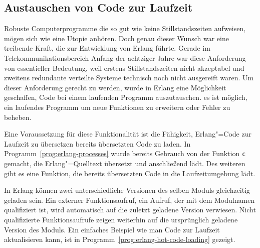 \subsection{Austauschen von Code zur Laufzeit}

Robuste Computerprogramme die so gut wie keine Stillstandszeiten aufweisen, mögen sich wie eine Utopie anhören. Doch genau dieser Wunsch war eine treibende Kraft, die zur Entwicklung von Erlang führte. Gerade im Telekommunikationsbereich Anfang der achtziger Jahre war diese Anforderung von essentieller Bedeutung, weil erstens Stillstandszeiten nicht akzeptabel und zweitens redundante verteilte Systeme technisch noch nicht ausgereift waren. Um dieser Anforderung gerecht zu werden, wurde in Erlang eine Möglichkeit geschaffen, Code bei einem laufenden Programm auszutauschen. \Dah es ist möglich, ein laufendes Programm um neue Funktionen zu erweitern oder Fehler zu beheben.

Eine Voraussetzung für diese Funktionalität ist die Fähigkeit, Erlang"=Code zur Laufzeit zu übersetzen \bzw bereits übersetzten Code zu laden. In Programm~\ref{prog:erlang-processes} wurde bereits Gebrauch von der Funktion \lstinline{c} gemacht, die Erlang"=Quelltext übersetzt und anschließend lädt. Des weiteren gibt es eine Funktion, die bereits übersetzten Code in die Laufzeitumgebung lädt.

In Erlang können zwei unterschiedliche Versionen des selben Moduls gleichzeitig geladen sein. Ein externer Funktionsaufruf, \dah ein Aufruf, der mit dem Modulnamen qualifiziert ist, wird automatisch auf die zuletzt geladene Version verwiesen. Nicht qualifizierte Funktionsaufrufe zeigen weiterhin auf die ursprünglich geladene Version des Moduls. Ein einfaches Beispiel wie man Code zur Laufzeit aktualisieren kann, ist in Programm~\ref{prog:erlang-hot-code-loading} gezeigt.

